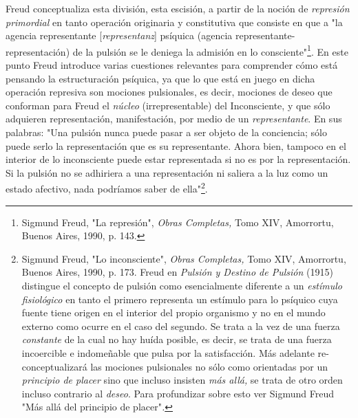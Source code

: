 \documentclass{book}
\begin{document}
Freud conceptualiza esta división, esta escisión, a partir de la noción
de \emph{represión primordial} en tanto operación originaria y
constitutiva que consiste en que a "la agencia representante
{[}\emph{representanz}{]} psíquica (agencia
representante-representación) de la pulsión se le deniega la admisión en
lo consciente"\footnote{Sigmund Freud, "La represión", \emph{Obras
  Completas,} Tomo XIV, Amorrortu, Buenos Aires, 1990, p. 143.}. En este
punto Freud introduce varias cuestiones relevantes para comprender cómo
está pensando la estructuración psíquica, ya que lo que está en juego en
dicha operación represiva son mociones pulsionales, es decir, mociones
de deseo que conforman para Freud el \emph{núcleo} (irrepresentable) del
Inconsciente, y que sólo adquieren representación, manifestación, por
medio de un \emph{representante}. En sus palabras: "Una pulsión nunca
puede pasar a ser objeto de la conciencia; sólo puede serlo la
representación que es su representante. Ahora bien, tampoco en el
interior de lo inconsciente puede estar representada si no es por la
representación. Si la pulsión no se adhiriera a una representación ni
saliera a la luz como un estado afectivo, nada podríamos saber de
ella"\footnote{Sigmund Freud, "Lo inconsciente", \emph{Obras Completas,}
  Tomo XIV, Amorrortu, Buenos Aires, 1990, p. 173. Freud en
  \emph{Pulsión y Destino de Pulsión} (1915) distingue el concepto de
  pulsión como esencialmente diferente a un \emph{estímulo fisiológico}
  en tanto el primero representa un estímulo para lo psíquico cuya
  fuente tiene origen en el interior del propio organismo y no en el
  mundo externo como ocurre en el caso del segundo. Se trata a la vez de
  una fuerza \emph{constante} de la cual no hay huída posible, es decir,
  se trata de una fuerza incoercible e indomeñable que pulsa por la
  satisfacción. Más adelante re-conceptualizará las mociones pulsionales
  no sólo como orientadas por un \emph{principio de placer} sino que
  incluso insisten \emph{más allá,} se trata de otro orden incluso
  contrario al \emph{deseo}. Para profundizar sobre esto ver Sigmund
  Freud "Más allá del principio de placer"\emph{.}}.
\end{document}
